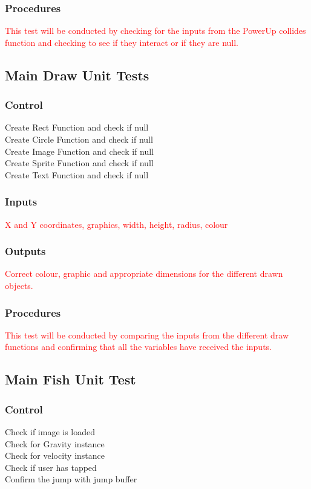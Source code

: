 \documentclass[11pt, oneside]{article}   	%
\begin{document}
\subsubsection{Procedures}
\textcolor{red}{This test will be conducted by checking for the inputs from the PowerUp collides function and checking to see if they interact or if they are null.}

\subsection{Main Draw Unit Tests}
\subsubsection{Control}
Create Rect Function and check if null \\
Create Circle Function and check if null \\ 
Create Image Function and check if null \\ 
Create Sprite Function and check if null \\ 
Create Text Function and check if null \\ 

\subsubsection{Inputs}
\textcolor{red}{X and Y coordinates, graphics, width, height, radius, colour}

\subsubsection{Outputs}
\textcolor{red}{Correct colour, graphic and appropriate dimensions for the different drawn objects.}

\subsubsection{Procedures}
\textcolor{red}{This test will be conducted by comparing the inputs from the different draw functions and confirming that all the variables have received the inputs.}


\subsection{Main Fish Unit Test}
\subsubsection{Control}
Check if image is loaded \\ 
Check for Gravity instance \\ 
Check for velocity instance \\ 
Check if user has tapped \\ 
Confirm the jump with jump buffer \\ 
\end{document}
